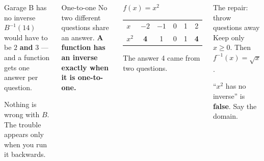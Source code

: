 \documentclass[aspectratio=169, 11pt]{beamer}
\begin{document}
\begin{frame}[t, plain]

  \begin{columns}[T, onlytextwidth]
      \begin{block}{Garage B has no inverse}
        \(B^{-1}(14)\) would have to be \(2\) \textbf{and} \(3\) --- and a
        function gets one answer per question.

        \smallskip
        Nothing is wrong with \(B\). The trouble appears only when you run it
        backwards.
      \end{block}

      \medskip
      \begin{block}{One-to-one}
        No two different questions share an answer. \textbf{A function has an
        inverse exactly when it is one-to-one.}
      \end{block}

      \begin{block}{\(f(x) = x^2\)}
        \renewcommand{\arraystretch}{1.2}
        \begin{tabular}{@{}lccccc@{}}
          \(x\)   & \(-2\) & \(-1\) & 0 & 1 & 2 \\
          \(x^2\) & \textbf{4} & 1 & 0 & 1 & \textbf{4} \\
        \end{tabular}

        \smallskip
        The answer 4 came from two questions.
      \end{block}

      \medskip
      \begin{block}{The repair: throw questions away}
        Keep only \(x \ge 0\). Then \(f^{-1}(x) = \sqrt{x}\).

        \smallskip
        ``\(x^2\) has no inverse'' is \textbf{false}. Say the domain.
      \end{block}
  \end{columns}
\end{frame}
\end{document}
